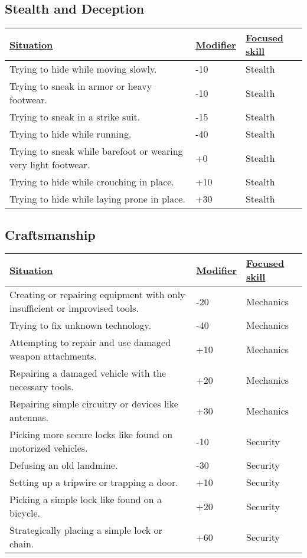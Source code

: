 \subsection{Stealth and Deception} %
\begin{tabularx}{\textwidth}{|X|l|l|}
	\hline
	\ul{Situation} & \ul{Modifier} & \ul{Focused skill} \\ \hline
	Trying to hide while moving slowly. & -10 & Stealth \\ \hline
	Trying to sneak in armor or heavy footwear. & -10 & Stealth \\ \hline
	Trying to sneak in a strike suit. & -15 & Stealth \\ \hline
	Trying to hide while running. & -40 & Stealth \\ \hline
	Trying to sneak while barefoot or wearing very light footwear. & +0 & Stealth \\ \hline
	Trying to hide while crouching in place. & +10 & Stealth \\ \hline
	Trying to hide while laying prone in place. & +30 & Stealth \\ \hline
\end{tabularx}

\subsection{Craftsmanship}
\begin{tabularx}{\textwidth}{|X|l|l|}
	\hline
	\ul{Situation} & \ul{Modifier} & \ul{Focused skill} \\ \hline
	Creating or repairing equipment with only insufficient or improvised tools. & -20 & Mechanics \\ \hline
	Trying to fix unknown technology. & -40 & Mechanics \\ \hline
	Attempting to repair and use damaged weapon attachments. & +10 & Mechanics \\ \hline
	Repairing a damaged vehicle with the necessary tools. & +20 & Mechanics \\ \hline
	Repairing simple circuitry or devices like antennas. & +30 & Mechanics \\ \hline
	Picking more secure locks like found on motorized vehicles. & -10 & Security \\ \hline
	Defusing an old landmine. & -30 & Security \\ \hline
	Setting up a tripwire or trapping a door. & +10 & Security \\ \hline
	Picking a simple lock like found on a bicycle. & +20 & Security \\ \hline
	Strategically placing a simple lock or chain. & +60 & Security \\ \hline
\end{tabularx}